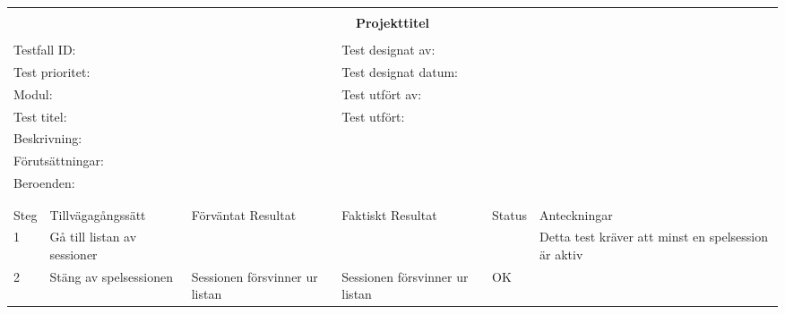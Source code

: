 \documentclass[10pt]{article}
\begin{document}
\begin{tabular}{| p{1cm}|  p{3cm} | p{3cm}| p{3cm}| p{2cm}| p{3cm}|}


	\hline
	\multicolumn{6}{|l|}{}\\
	\multicolumn{6}{|c|}{\huge{\textbf{Projekttitel}}}\\
	\multicolumn{6}{|l|}{}\\
	\hline
	\multicolumn{3}{|l|}{Testfall ID:}&\multicolumn{3}{|l|}{Test designat av:}\\
	\hline
	\multicolumn{3}{|l|}{Test prioritet:}&\multicolumn{3}{|l|}{Test designat datum:}\\
	\hline
	\multicolumn{3}{|l|}{Modul:}&\multicolumn{3}{|l|}{Test utfört av:}\\
	\hline
	\multicolumn{3}{|l|}{Test titel:}&\multicolumn{3}{|l|}{Test utfört:}\\
	\hline
	\multicolumn{3}{|l|}{Beskrivning:}&\multicolumn{3}{|l|}{}\\
	\hline
	\multicolumn{6}{|l|}{Förutsättningar:}\\
	\hline
	\multicolumn{6}{|l|}{Beroenden:}\\
	
	\hline
	\multicolumn{6}{|l|}{}\\
	\multicolumn{6}{|l|}{}\\
      	\hline
	Steg&Tillvägagångssätt&Förväntat Resultat&Faktiskt Resultat&Status&Anteckningar \\
	\hline
	1&Gå till listan av sessioner&&&&Detta test kräver att minst en spelsession är aktiv\\
      	\hline
	2&Stäng av spelsessionen&Sessionen försvinner ur listan&Sessionen försvinner ur listan&OK&\\
      	\hline
\end{tabular}
\end{document}
